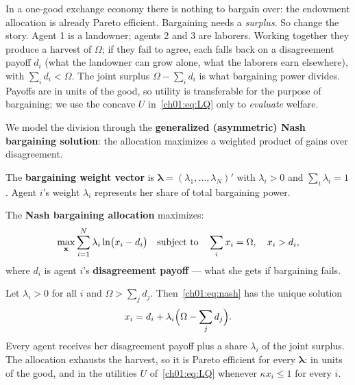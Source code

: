 \documentclass[../structural_economics_book.tex]{subfiles}
\begin{document}
In a one-good exchange economy there is nothing to bargain over: the endowment allocation is already Pareto efficient. Bargaining needs a \textit{surplus}. So change the story. Agent 1 is a landowner; agents 2 and 3 are laborers. Working together they produce a harvest of $\Omega$; if they fail to agree, each falls back on a disagreement payoff $d_i$ (what the landowner can grow alone, what the laborers earn elsewhere), with $\sum_i d_i < \Omega$. The joint surplus $\Omega - \sum_i d_i$ is what bargaining power divides. Payoffs are in units of the good, so utility is transferable for the purpose of bargaining; we use the concave $U$ in~\eqref{ch01:eq:LQ} only to \textit{evaluate} welfare.

We model the division through the \textbf{generalized (asymmetric) Nash bargaining solution}: the allocation maximizes a weighted product of gains over disagreement.

\begin{definition}\label{ch01:def:bargaining_power}
The \textbf{bargaining weight vector} is $\boldsymbol{\lambda} = (\lambda_1, \ldots, \lambda_N)'$ with $\lambda_i > 0$ and $\sum_i \lambda_i = 1$. Agent $i$'s weight $\lambda_i$ represents her share of total bargaining power.
\end{definition}

\begin{definition}\label{ch01:def:nash}
The \textbf{Nash bargaining allocation} maximizes:
\begin{equation}\label{ch01:eq:nash}
\max_{\mathbf{x}} \sum_{i=1}^N \lambda_i \ln\bigl(x_i - d_i\bigr) \quad \text{subject to} \quad \sum_i x_i = \Omega, \quad x_i > d_i,
\end{equation}
where $d_i$ is agent $i$'s \textbf{disagreement payoff} --- what she gets if bargaining fails.
\end{definition}

\begin{proposition}\label{ch01:prop:nash_division}
Let $\lambda_i > 0$ for all $i$ and $\Omega > \sum_j d_j$. Then~\eqref{ch01:eq:nash} has the unique solution
\begin{equation}\label{ch01:eq:nash_division}
x_i = d_i + \lambda_i\Bigl(\Omega - \sum_{j} d_j\Bigr).
\end{equation}
Every agent receives her disagreement payoff plus a share $\lambda_i$ of the joint surplus. The allocation exhausts the harvest, so it is Pareto efficient for every $\boldsymbol{\lambda}$: in units of the good, and in the utilities $U$ of~\eqref{ch01:eq:LQ} whenever $\kappa x_i \le 1$ for every $i$.
\end{proposition}
\end{document}

